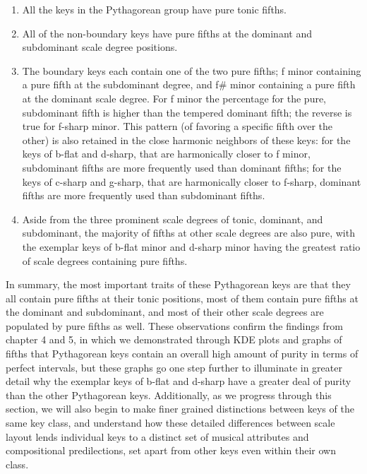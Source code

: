 \begin{enumerate}
\def\labelenumi{\arabic{enumi}.}
\tightlist
\item
  All the keys in the Pythagorean group have pure tonic fifths.
\item
  All of the non-boundary keys have pure fifths at the dominant and
  subdominant scale degree positions.
\item
  The boundary keys each contain one of the two pure fifths; f minor
  containing a pure fifth at the subdominant degree, and f\# minor
  containing a pure fifth at the dominant scale degree. For f minor the
  percentage for the pure, subdominant fifth is higher than the tempered
  dominant fifth; the reverse is true for f-sharp minor. This pattern
  (of favoring a specific fifth over the other) is also retained in the
  close harmonic neighbors of these keys: for the keys of b-flat and
  d-sharp, that are harmonically closer to f minor, subdominant fifths
  are more frequently used than dominant fifths; for the keys of c-sharp
  and g-sharp, that are harmonically closer to f-sharp, dominant fifths
  are more frequently used than subdominant fifths.
\item
  Aside from the three prominent scale degrees of tonic, dominant, and
  subdominant, the majority of fifths at other scale degrees are also
  pure, with the exemplar keys of b-flat minor and d-sharp minor having
  the greatest ratio of scale degrees containing pure fifths.
\end{enumerate}

In summary, the most important traits of these Pythagorean keys are that
they all contain pure fifths at their tonic positions, most of them
contain pure fifths at the dominant and subdominant, and most of their
other scale degrees are populated by pure fifths as well. These
observations confirm the findings from chapter 4 and 5, in which we
demonstrated through KDE plots and graphs of fifths that Pythagorean
keys contain an overall high amount of purity in terms of perfect
intervals, but these graphs go one step further to illuminate in greater
detail why the exemplar keys of b-flat and d-sharp have a greater deal
of purity than the other Pythagorean keys. Additionally, as we progress
through this section, we will also begin to make finer grained
distinctions between keys of the same key class, and understand how
these detailed differences between scale layout lends individual keys to
a distinct set of musical attributes and compositional predilections,
set apart from other keys even within their own class.


